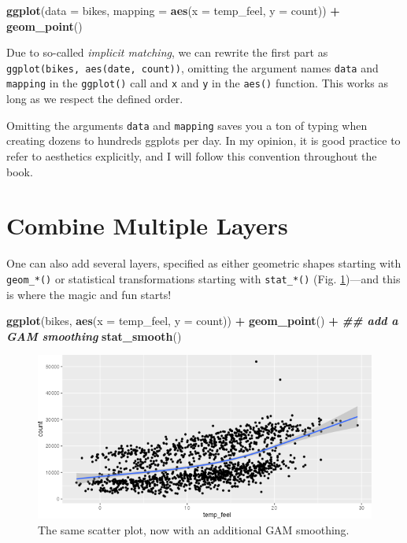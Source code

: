 \documentclass[
]{krantz}
\makeatletter
\newenvironment{Shaded}{\begin{snugshade}}{\end{snugshade}}
\newcommand{\AttributeTok}[1]{\textcolor[rgb]{0.27,0.27,0.27}{#1}}
\newcommand{\DocumentationTok}[1]{\textcolor[rgb]{0.37,0.37,0.37}{\textbf{\textit{#1}}}}
\newcommand{\FunctionTok}[1]{\textcolor[rgb]{0.27,0.27,0.27}{\textbf{#1}}}
\newcommand{\NormalTok}[1]{#1}
\newcommand{\SpecialCharTok}[1]{\textcolor[rgb]{0.43,0.43,0.43}{\textbf{#1}}}
\newenvironment{kframe}{%
\medskip{}
\setlength{\fboxsep}{.8em}
 \def\at@end@of@kframe{}%
 \ifinner\ifhmode%
  \def\at@end@of@kframe{\end{minipage}}%
  \begin{minipage}{\columnwidth}%
 \fi\fi%
 \def\FrameCommand##1{\hskip\@totalleftmargin \hskip-\fboxsep
 \colorbox{shadecolor}{##1}\hskip-\fboxsep
     \hskip-\linewidth \hskip-\@totalleftmargin \hskip\columnwidth}%
 \MakeFramed {\advance\hsize-\width
   \@totalleftmargin\z@ \linewidth\hsize
   \@setminipage}}%
 {\par\unskip\endMakeFramed%
 \at@end@of@kframe}
\renewenvironment{Shaded}{\begin{kframe}}{\end{kframe}}
\makeatother
\begin{document}
\begin{Shaded}
\begin{Highlighting}[]
\FunctionTok{ggplot}\NormalTok{(}\AttributeTok{data =}\NormalTok{ bikes, }\AttributeTok{mapping =} \FunctionTok{aes}\NormalTok{(}\AttributeTok{x =}\NormalTok{ temp\_feel, }\AttributeTok{y =}\NormalTok{ count)) }\SpecialCharTok{+}
  \FunctionTok{geom\_point}\NormalTok{()}
\end{Highlighting}
\end{Shaded}

Due to so-called \emph{implicit matching}, we can rewrite the first part as \texttt{ggplot(bikes,\ aes(date,\ count))}, omitting the argument names \texttt{data} and \texttt{mapping} in the \texttt{ggplot()} call and \texttt{x} and \texttt{y} in the \texttt{aes()} function. This works as long as we respect the defined order.

Omitting the arguments \texttt{data} and \texttt{mapping} saves you a ton of typing when creating dozens to hundreds ggplots per day. In my opinion, it is good practice to refer to aesthetics explicitly, and I will follow this convention throughout the book.

\hypertarget{combined-layers}{%
\section{Combine Multiple Layers}\label{combined-layers}}

One can also add several layers, specified as either geometric shapes starting with \texttt{geom\_*()} or statistical transformations starting with \texttt{stat\_*()} (Fig. \ref{fig:04ggplotBasicSmooth})---and this is where the magic and fun starts!

\begin{Shaded}
\begin{Highlighting}[]
\FunctionTok{ggplot}\NormalTok{(bikes, }\FunctionTok{aes}\NormalTok{(}\AttributeTok{x =}\NormalTok{ temp\_feel, }\AttributeTok{y =}\NormalTok{ count)) }\SpecialCharTok{+} 
  \FunctionTok{geom\_point}\NormalTok{() }\SpecialCharTok{+} 
  \DocumentationTok{\#\# add a GAM smoothing}
  \FunctionTok{stat\_smooth}\NormalTok{()}
\end{Highlighting}
\end{Shaded}

\begin{figure}
\centering
\includegraphics{bookdown_files/figure-latex/04ggplotBasicSmooth-1.png}
\caption{\label{fig:04ggplotBasicSmooth}The same scatter plot, now with an additional GAM smoothing.}
\end{figure}
\end{document}
